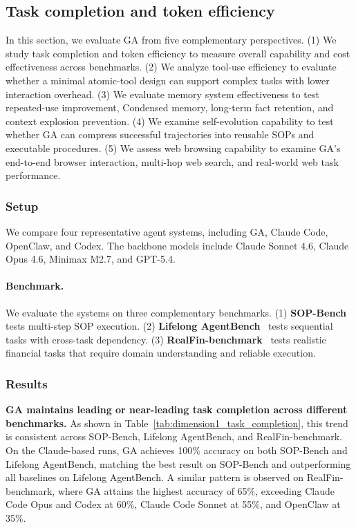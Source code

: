 

\subsection{Task completion and token efficiency}
\label{sec:exp_task_completion}
In this section, we evaluate GA from five complementary perspectives. 
(1) We study task completion and token efficiency to measure overall capability and cost effectiveness across benchmarks. 
(2) We analyze tool-use efficiency to evaluate whether a minimal atomic-tool design can support complex tasks with lower interaction overhead. 
(3) We evaluate memory system effectiveness to test repeated-use improvement, Condensed memory, long-term fact retention, and context explosion prevention. 
(4) We examine self-evolution capability to test whether GA can compress successful trajectories into reusable SOPs and executable procedures. 
(5) We assess web browsing capability to examine GA's end-to-end browser interaction, multi-hop web search, and real-world web task performance.

\subsubsection{Setup}
\label{sec:exp_task_completion_setup}
We compare four representative agent systems, including GA, Claude Code, OpenClaw, and Codex. The backbone models include Claude Sonnet 4.6, Claude Opus 4.6, Minimax M2.7, and GPT-5.4.

\paragraph{Benchmark.}
We evaluate the systems on three complementary benchmarks. (1) \textbf{SOP-Bench}~\citep{sopbench} tests multi-step SOP execution. (2) \textbf{Lifelong AgentBench}~\citep{lifelongagentbench} tests sequential tasks with cross-task dependency. (3) \textbf{RealFin-benchmark}~\citep{realfin} tests realistic financial tasks that require domain understanding and reliable execution.

\subsubsection{Results}
\label{sec:exp_task_completion_results}
\textbf{GA maintains leading or near-leading task completion across different benchmarks.}
As shown in Table~\ref{tab:dimension1_task_completion}, this trend is consistent across SOP-Bench, Lifelong AgentBench, and RealFin-benchmark. On the Claude-based runs, GA achieves 100\% accuracy on both SOP-Bench and Lifelong AgentBench, matching the best result on SOP-Bench and outperforming all baselines on Lifelong AgentBench. A similar pattern is observed on RealFin-benchmark, where GA attains the highest accuracy of 65\%, exceeding Claude Code Opus and Codex at 60\%, Claude Code Sonnet at 55\%, and OpenClaw at 35\%.

